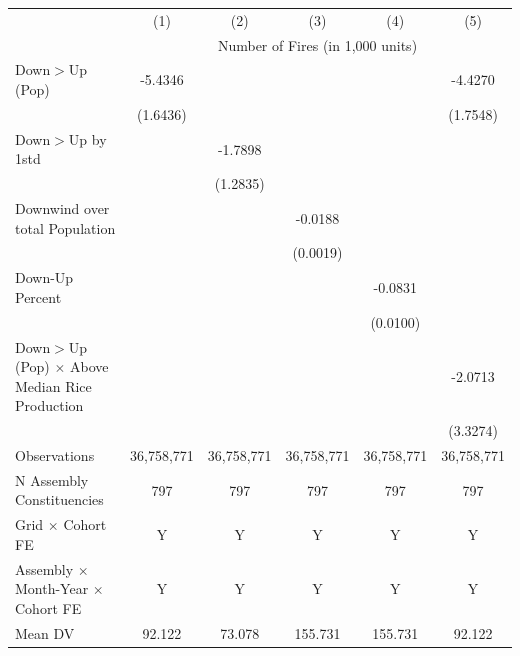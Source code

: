 \begin{tabular}{lccccc}
\hline
& (1) & (2) & (3) & (4) & (5)\\
& \multicolumn{5}{c}{Number of Fires (in 1,000 units) }\\
\hline

Down$>$Up (Pop)&     -5.4346\sym{***}&                     &                     &                     &     -4.4270\sym{**} \\
            &    (1.6436)         &                     &                     &                     &    (1.7548)         \\
Down$>$Up by 1std&                     &     -1.7898         &                     &                     &                     \\
            &                     &    (1.2835)         &                     &                     &                     \\
Downwind over total Population&                     &                     &     -0.0188\sym{***}&                     &                     \\
            &                     &                     &    (0.0019)         &                     &                     \\
Down-Up Percent&                     &                     &                     &     -0.0831\sym{***}&                     \\
            &                     &                     &                     &    (0.0100)         &                     \\
Down$>$Up (Pop) $\times$ Above Median Rice Production&                     &                     &                     &                     &     -2.0713         \\
            &                     &                     &                     &                     &    (3.3274)         \\
\hline
Observations&  36,758,771         &  36,758,771         &  36,758,771         &  36,758,771         &  36,758,771         \\
N Assembly Constituencies&         797         &         797         &         797         &         797         &         797         \\
Grid $\times$ Cohort FE&           Y         &           Y         &           Y         &           Y         &           Y         \\
Assembly $\times$ Month-Year $\times$ Cohort FE&           Y         &           Y         &           Y         &           Y         &           Y         \\
Mean DV     &      92.122         &      73.078         &     155.731         &     155.731         &      92.122         \\
\hline
\end{tabular}
